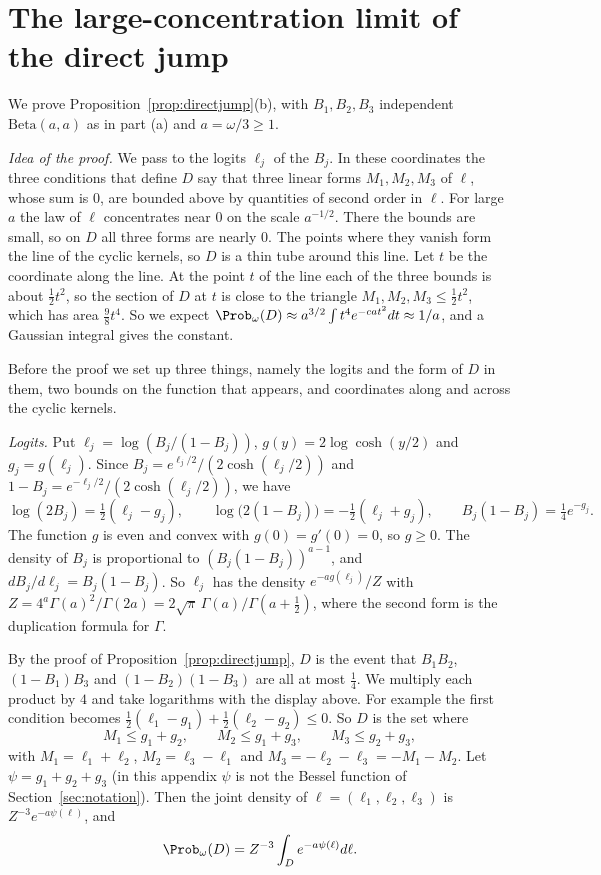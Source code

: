 \section{The large-concentration limit of the direct jump}\label{app:hdp}

We prove Proposition~\ref{prop:directjump}(b), with $B_1,B_2,B_3$ independent
$\mathrm{Beta}(a,a)$ as in part (a) and $a=\omega/3\ge1$.

\emph{Idea of the proof.} We pass to the logits $\ell_j$ of the $B_j$. In
these coordinates the three conditions that define $D$ say that three linear
forms $M_1,M_2,M_3$ of $\ell$, whose sum is $0$, are bounded above by
quantities of second order in $\ell$. For large $a$ the law of $\ell$
concentrates near $0$ on the scale $a^{-1/2}$. There the bounds are small, so
on $D$ all three forms are nearly $0$. The points where they vanish form the
line of the cyclic kernels, so $D$ is a thin tube around this line. Let $t$ be
the coordinate along the line. At the point $t$ of the line each of the three
bounds is about $\frac12t^2$, so the section of $D$ at $t$ is close to the
triangle $M_1,M_2,M_3\le\frac12t^2$, which has area $\frac98t^4$. So we expect
$\Prob_\omega(D)\approx a^{3/2}\int t^4e^{-cat^2}dt\approx1/a$, and a Gaussian
integral gives the constant.

Before the proof we set up three things, namely the logits and the form of $D$
in them, two bounds on the function that appears, and coordinates along and
across the cyclic kernels.

\emph{Logits.} Put $\ell_j=\log(B_j/(1-B_j))$, $g(y)=2\log\cosh(y/2)$ and
$g_j=g(\ell_j)$. Since $B_j=e^{\ell_j/2}/(2\cosh(\ell_j/2))$ and
$1-B_j=e^{-\ell_j/2}/(2\cosh(\ell_j/2))$, we have
\[
 \log(2B_j)=\tfrac12(\ell_j-g_j),\qquad
 \log\bigl(2(1-B_j)\bigr)=-\tfrac12(\ell_j+g_j),\qquad
 B_j(1-B_j)=\tfrac14e^{-g_j}.
\]
The function $g$ is even and convex with $g(0)=g'(0)=0$, so $g\ge0$. The
density of $B_j$ is proportional to $(B_j(1-B_j))^{a-1}$, and
$dB_j/d\ell_j=B_j(1-B_j)$. So $\ell_j$ has the density $e^{-ag(\ell_j)}/Z$ with
$Z=4^a\Gamma(a)^2/\Gamma(2a)=2\sqrt\pi\,\Gamma(a)/\Gamma(a+\frac12)$, where the
second form is the duplication formula for $\Gamma$.

By the proof of Proposition~\ref{prop:directjump}, $D$ is the event that
$B_1B_2$, $(1-B_1)B_3$ and $(1-B_2)(1-B_3)$ are all at most $\frac14$. We
multiply each product by $4$ and take logarithms with the display above. For
example the first condition becomes
$\frac12(\ell_1-g_1)+\frac12(\ell_2-g_2)\le0$. So $D$ is the set where
\begin{equation}\label{eq:hdp-constraints}
 M_1\le g_1+g_2,\qquad M_2\le g_1+g_3,\qquad M_3\le g_2+g_3,
\end{equation}
with $M_1=\ell_1+\ell_2$, $M_2=\ell_3-\ell_1$ and
$M_3=-\ell_2-\ell_3=-M_1-M_2$. Let $\psi=g_1+g_2+g_3$ (in this appendix $\psi$
is not the Bessel function of Section~\ref{sec:notation}). Then the joint density
of $\ell=(\ell_1,\ell_2,\ell_3)$ is $Z^{-3}e^{-a\psi(\ell)}$, and
\begin{equation}\label{eq:hdp-integral}
 \Prob_\omega(D)=Z^{-3}\int_De^{-a\psi(\ell)}d\ell.
\end{equation}

